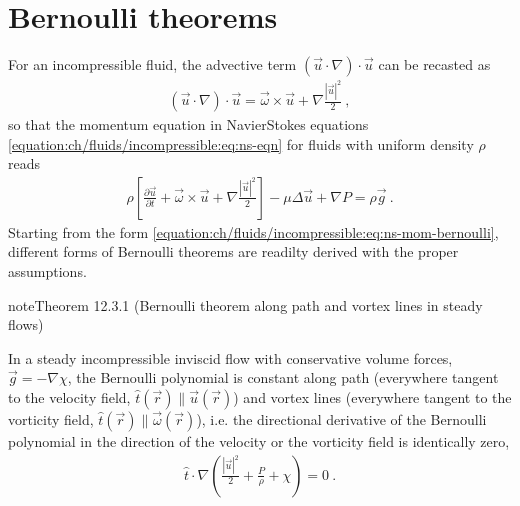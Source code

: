 \documentclass[letterpaper,10pt,english]{jupyterBook}
\begin{document}
\section{Bernoulli theorems}
\label{\detokenize{ch/fluids/incompressible:bernoulli-theorems}}\label{\detokenize{ch/fluids/incompressible:id1}}
\sphinxAtStartPar
For an incompressible fluid, the advective term \((\vec{u} \cdot \nabla) \cdot \vec{u}\) can be recasted as
\begin{equation*}
\begin{split}(\vec{u} \cdot \nabla) \cdot \vec{u} = \vec{\omega} \times \vec{u} + \nabla \frac{|\vec{u}|^2}{2} \ ,\end{split}
\end{equation*}
\sphinxAtStartPar
so that the momentum equation in Navier\sphinxhyphen{}Stokes equations \eqref{equation:ch/fluids/incompressible:eq:ns-eqn} for fluids with uniform density \(\rho\) reads
\begin{equation}\label{equation:ch/fluids/incompressible:eq:ns-mom-bernoulli}
\begin{split} \rho \left[ \frac{\partial \vec{u}}{\partial t} + \vec{\omega} \times \vec{u} + \nabla \frac{|\vec{u}|^2}{2} \right] - \mu \Delta \vec{u} + \nabla P = \rho \vec{g} \ .\end{split}
\end{equation}
\sphinxAtStartPar
Starting from the form \eqref{equation:ch/fluids/incompressible:eq:ns-mom-bernoulli}, different forms of Bernoulli theorems are readilty derived with the proper assumptions.
\label{ch/fluids/incompressible:theorem-0}
\begin{sphinxadmonition}{note}{Theorem 12.3.1 (Bernoulli theorem along path and vortex lines in steady flows)}



\sphinxAtStartPar
In a steady incompressible inviscid flow with conservative volume forces, \(\vec{g} = - \nabla \chi\), the Bernoulli polynomial is constant along path (everywhere tangent to the velocity field, \(\hat{t}(\vec{r}) \parallel \vec{u}(\vec{r})\)) and vortex lines (everywhere tangent to the vorticity field, \(\hat{t}(\vec{r}) \parallel \vec{\omega}(\vec{r})\)), i.e. the directional derivative of the Bernoulli polynomial in the direction of the velocity or the vorticity field is identically zero,
\begin{equation*}
\begin{split}\hat{t} \cdot \nabla \left( \frac{|\vec{u}|^2}{2} + \frac{P}{\rho} + \chi \right) = 0 \ .\end{split}
\end{equation*}\end{sphinxadmonition}
\end{document}

